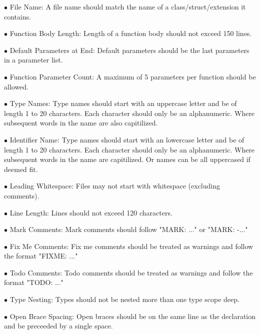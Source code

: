\documentclass[12pt]{article}
\begin{document}
   \item[$\bullet$]File Name: \newline  A file name should match the name of a class/struct/extension it contains.
    \item[$\bullet$]Function Body Length: \newline  Length of a function body should not exceed 150 lines.
     \item[$\bullet$] Default Parameters at End: \newline Default parameters should be the last parameters in a parameter list.
 \item[$\bullet$]Function Parameter Count: \newline A maximum of 5 parameters per function should be allowed.
 \item[$\bullet$]Type Names: \newline Type names should start with an uppercase letter and be of length 1 to 20 characters. Each
  character should only be an alphanumeric. Where subsequent words in the name are also 
  capitilized.
 \item[$\bullet$]Identifier Name: \newline Type names should start with an lowercase letter and be of length 1 to 20 characters. Each
  character should only be an alphanumeric. Where subsequent words in the name are capitilized.
  Or names can be all uppercased if deemed fit.
 \item[$\bullet$] Leading Whitespace: \newline Files may not start with whitespace (excluding comments).
 \item[$\bullet$]Line Length: \newline Lines should not exceed 120 characters.
  \item[$\bullet$]Mark Comments: \newline Mark comments should follow "MARK: ..." or "MARK: -..."
 \item[$\bullet$] Fix Me Comments: \newline Fix me comments should be treated as warnings and follow the format "FIXME: ..."
 \item[$\bullet$] Todo Comments: \newline Todo comments should be treated as warnings and follow the format "TODO: ..."
 \item[$\bullet$] Type Nesting: \newline Types should not be nested more than one type scope deep.
 \item[$\bullet$] Open Brace Spacing: \newline Open braces should be on the same line as the declaration and be preceeded by a single space.
\end{document}
